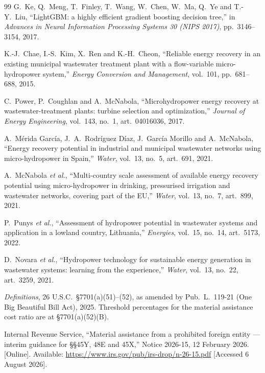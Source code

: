 \documentclass[12pt,letterpaper]{report}
\begin{document}
\begin{thebibliography}{99}
G.~Ke, Q.~Meng, T.~Finley, T.~Wang, W.~Chen, W.~Ma, Q.~Ye and T.-Y.~Liu,
``LightGBM: a highly efficient gradient boosting decision tree,''
in \emph{Advances in Neural Information Processing Systems 30 (NIPS 2017)},
pp.~3146--3154, 2017.


K.-J.~Chae, I.-S.~Kim, X.~Ren and K.-H.~Cheon,
``Reliable energy recovery in an existing municipal wastewater treatment plant with a
flow-variable micro-hydropower system,''
\emph{Energy Conversion and Management}, vol.~101, pp.~681--688, 2015.

C.~Power, P.~Coughlan and A.~McNabola,
``Microhydropower energy recovery at wastewater-treatment plants: turbine selection and
optimization,''
\emph{Journal of Energy Engineering}, vol.~143, no.~1, art.~04016036, 2017.

A.~M\'erida Garc\'ia, J.~A.~Rodr\'iguez D\'iaz, J.~Garc\'ia Morillo and A.~McNabola,
``Energy recovery potential in industrial and municipal wastewater networks using
micro-hydropower in Spain,''
\emph{Water}, vol.~13, no.~5, art.~691, 2021.

A.~McNabola \emph{et al.},
``Multi-country scale assessment of available energy recovery potential using
micro-hydropower in drinking, pressurised irrigation and wastewater networks, covering
part of the EU,''
\emph{Water}, vol.~13, no.~7, art.~899, 2021.

P.~Punys \emph{et al.},
``Assessment of hydropower potential in wastewater systems and application in a lowland
country, Lithuania,''
\emph{Energies}, vol.~15, no.~14, art.~5173, 2022.

D.~Novara \emph{et al.},
``Hydropower technology for sustainable energy generation in wastewater systems:
learning from the experience,''
\emph{Water}, vol.~13, no.~22, art.~3259, 2021.


\emph{Definitions}, 26 U.S.C.\ \S7701(a)(51)--(52), as amended by Pub.\ L.\ 119-21
(One Big Beautiful Bill Act), 2025. Threshold percentages for the material assistance
cost ratio are at \S7701(a)(52)(B).

Internal Revenue Service,
``Material assistance from a prohibited foreign entity --- interim guidance for
\S\S45Y, 48E and 45X,'' Notice 2026-15, 12 February 2026.
[Online]. Available: \url{https://www.irs.gov/pub/irs-drop/n-26-15.pdf}
[Accessed 6 August 2026].


\end{thebibliography}
\end{document}
